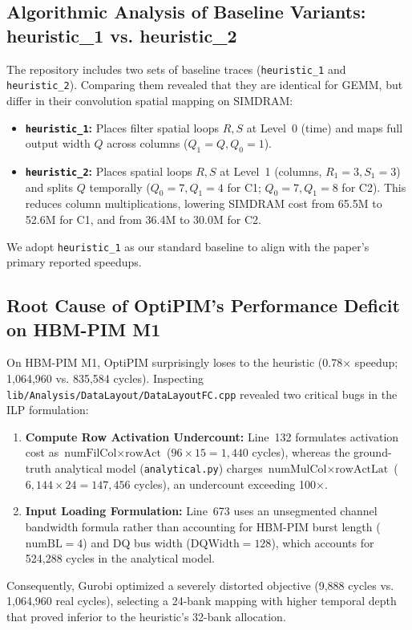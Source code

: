 \subsection{Algorithmic Analysis of Baseline Variants: heuristic\_1 vs. heuristic\_2}
The repository includes two sets of baseline traces (\texttt{heuristic\_1} and \texttt{heuristic\_2}). Comparing them revealed that they are identical for GEMM, but differ in their convolution spatial mapping on SIMDRAM:
\begin{itemize}
    \item \textbf{\texttt{heuristic\_1}:} Places filter spatial loops $R, S$ at Level~0 (time) and maps full output width $Q$ across columns ($Q_1=Q, Q_0=1$).
    \item \textbf{\texttt{heuristic\_2}:} Places spatial loops $R, S$ at Level~1 (columns, $R_1=3, S_1=3$) and splits $Q$ temporally ($Q_0=7, Q_1=4$ for C1; $Q_0=7, Q_1=8$ for C2). This reduces column multiplications, lowering SIMDRAM cost from 65.5M to 52.6M for C1, and from 36.4M to 30.0M for C2.
\end{itemize}
We adopt \texttt{heuristic\_1} as our standard baseline to align with the paper's primary reported speedups.

\subsection{Root Cause of OptiPIM's Performance Deficit on HBM-PIM M1}
On HBM-PIM M1, OptiPIM surprisingly loses to the heuristic (0.78$\times$ speedup; 1,064,960 vs. 835,584 cycles). Inspecting \texttt{lib/Analysis/DataLayout/DataLayoutFC.cpp} revealed two critical bugs in the ILP formulation:
\begin{enumerate}
    \item \textbf{Compute Row Activation Undercount:} Line~132 formulates activation cost as $\text{numFilCol} \times \text{rowAct}$ ($96 \times 15 = 1{,}440$ cycles), whereas the ground-truth analytical model (\texttt{analytical.py}) charges $\text{numMulCol} \times \text{rowActLat}$ ($6{,}144 \times 24 = 147{,}456$ cycles), an undercount exceeding 100$\times$.
    \item \textbf{Input Loading Formulation:} Line~673 uses an unsegmented channel bandwidth formula rather than accounting for HBM-PIM burst length ($\text{numBL}=4$) and DQ bus width ($\text{DQWidth}=128$), which accounts for 524,288 cycles in the analytical model.
\end{enumerate}
Consequently, Gurobi optimized a severely distorted objective (9,888 cycles vs. 1,064,960 real cycles), selecting a 24-bank mapping with higher temporal depth that proved inferior to the heuristic's 32-bank allocation.
